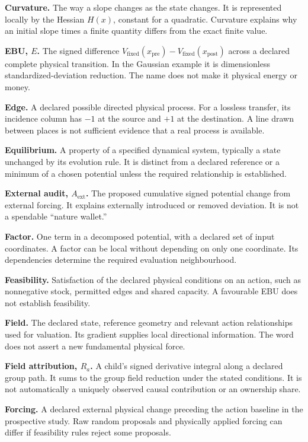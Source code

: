 \textbf{Curvature.} The way a slope changes as the state changes. It is represented locally by the Hessian $H(x)$, constant for a quadratic. Curvature explains why an initial slope times a finite quantity differs from the exact finite value.

\textbf{EBU, $E$.} The signed difference $V_{\mathrm{fixed}}(x_{\mathrm{pre}})-V_{\mathrm{fixed}}(x_{\mathrm{post}})$ across a declared complete physical transition. In the Gaussian example it is dimensionless standardized-deviation reduction. The name does not make it physical energy or money.

\textbf{Edge.} A declared possible directed physical process. For a lossless transfer, its incidence column has $-1$ at the source and $+1$ at the destination. A line drawn between places is not sufficient evidence that a real process is available.

\textbf{Equilibrium.} A property of a specified dynamical system, typically a state unchanged by its evolution rule. It is distinct from a declared reference or a minimum of a chosen potential unless the required relationship is established.

\textbf{External audit, $A_{\mathrm{ext}}$.} The proposed cumulative signed potential change from external forcing. It explains externally introduced or removed deviation. It is not a spendable ``nature wallet.''

\textbf{Factor.} One term in a decomposed potential, with a declared set of input coordinates. A factor can be local without depending on only one coordinate. Its dependencies determine the required evaluation neighbourhood.

\textbf{Feasibility.} Satisfaction of the declared physical conditions on an action, such as nonnegative stock, permitted edges and shared capacity. A favourable EBU does not establish feasibility.

\textbf{Field.} The declared state, reference geometry and relevant action relationships used for valuation. Its gradient supplies local directional information. The word does not assert a new fundamental physical force.

\textbf{Field attribution, $R_a$.} A child's signed derivative integral along a declared group path. It sums to the group field reduction under the stated conditions. It is not automatically a uniquely observed causal contribution or an ownership share.

\textbf{Forcing.} A declared external physical change preceding the action baseline in the prospective study. Raw random proposals and physically applied forcing can differ if feasibility rules reject some proposals.


